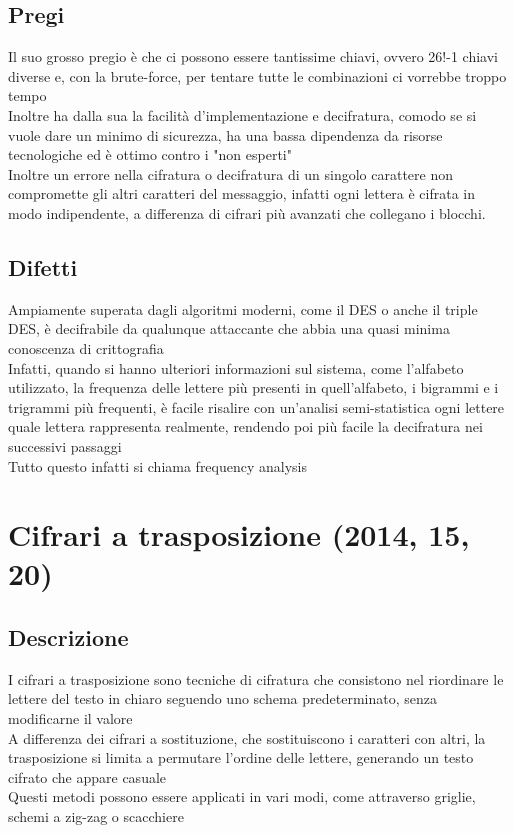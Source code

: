 \documentclass[10pt,oneside,a4paper]{article}
\begin{document}
\subsection{Pregi}
Il suo grosso pregio è che ci possono essere tantissime chiavi, ovvero 26!-1 chiavi diverse e, con la brute-force, per tentare tutte le combinazioni ci vorrebbe troppo tempo\\
Inoltre ha dalla sua la facilità d'implementazione e decifratura, comodo se si vuole dare un minimo di sicurezza, ha una bassa dipendenza da risorse tecnologiche ed è ottimo contro i "non esperti"\\
Inoltre un errore nella cifratura o decifratura di un singolo carattere non compromette gli altri caratteri del messaggio, infatti ogni lettera è cifrata in modo indipendente, a differenza di cifrari più avanzati che collegano i blocchi.
\subsection{Difetti}
Ampiamente superata dagli algoritmi moderni, come il DES o anche il triple DES, è decifrabile da qualunque attaccante che abbia una quasi minima conoscenza di crittografia\\
Infatti, quando si hanno ulteriori informazioni sul sistema, come l'alfabeto utilizzato, la frequenza delle lettere più presenti in quell'alfabeto, i bigrammi e i trigrammi più frequenti, è facile risalire con un'analisi semi-statistica ogni lettere quale lettera rappresenta realmente, rendendo poi più facile la decifratura nei successivi passaggi\\
Tutto questo infatti si chiama frequency analysis
\section{Cifrari a trasposizione (2014, 15, 20)}
\subsection{Descrizione}
I cifrari a trasposizione sono tecniche di cifratura che consistono nel riordinare le lettere del testo in chiaro seguendo uno schema predeterminato, senza modificarne il valore\\
A differenza dei cifrari a sostituzione, che sostituiscono i caratteri con altri, la trasposizione si limita a permutare l'ordine delle lettere, generando un testo cifrato che appare casuale\\
Questi metodi possono essere applicati in vari modi, come attraverso griglie, schemi a zig-zag o scacchiere
\end{document}
